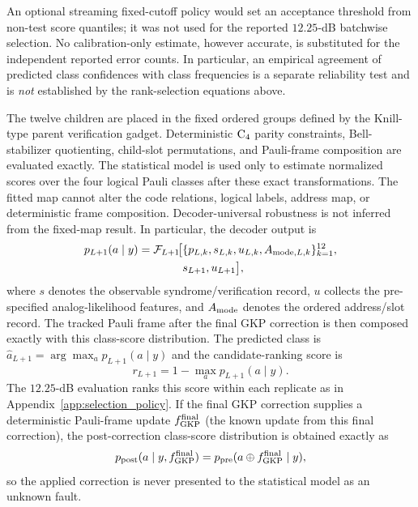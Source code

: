 \documentclass[aps,
prx,
superscriptaddress,
reprint,
longbibliography,
floatfix]{revtex4-2}
\begin{document}
An optional streaming fixed-cutoff policy would set an acceptance threshold from non-test score quantiles; it was not used for the reported $12.25$-dB batchwise selection. No calibration-only estimate, however accurate, is substituted for the independent reported error counts. In particular, an empirical agreement of predicted class confidences with class frequencies is a separate reliability test and is \emph{not} established by the rank-selection equations above.

The twelve children are placed in the fixed ordered groups defined by the Knill-type parent verification gadget. Deterministic ${\rm C_4}$ parity constraints, Bell-stabilizer quotienting, child-slot permutations, and Pauli-frame composition are evaluated exactly. The statistical model is used only to estimate normalized scores over the four logical Pauli classes after these exact transformations. The fitted map cannot alter the code relations, logical labels, address map, or deterministic frame composition. Decoder-universal robustness is not inferred from the fixed-map result. In particular, the decoder output is
\begin{equation}
\begin{aligned}
p_{L+1}(a\mid y)
=\mathcal F_{L+1}\!\bigl[
&\{p_{L,k},s_{L,k},u_{L,k},A_{{\rm mode},L,k}\}_{k=1}^{12},\\
&s_{L+1},u_{L+1}\bigr],
\end{aligned}
\label{eq:supp_frozen_recursive_map}
\end{equation}
where $s$ denotes the observable syndrome/verification record, $u$ collects the pre-specified analog-likelihood features, and $A_{\rm mode}$ denotes the ordered address/slot record. The tracked Pauli frame after the final GKP correction is then composed exactly with this class-score distribution. The predicted class is $\hat a_{L+1}=\arg\max_a p_{L+1}(a\mid y)$ and the candidate-ranking score is
\begin{equation}
r_{L+1}=1-\max_a p_{L+1}(a\mid y).
\label{eq:supp_decoder_uncertainty}
\end{equation}
The $12.25$-dB evaluation ranks this score within each replicate as in Appendix~\ref{app:selection_policy}. If the final GKP correction supplies a deterministic Pauli-frame update $f_{\rm GKP}^{\rm final}$ (the known update from this final correction), the post-correction class-score distribution is obtained exactly as
\begin{equation}
p_{\rm post}(a\mid y,f_{\rm GKP}^{\rm final})
=p_{\rm pre}(a\oplus f_{\rm GKP}^{\rm final}\mid y),
\label{eq:known_frame_composition}
\end{equation}
so the applied correction is never presented to the statistical model as an unknown fault.
\end{document}

